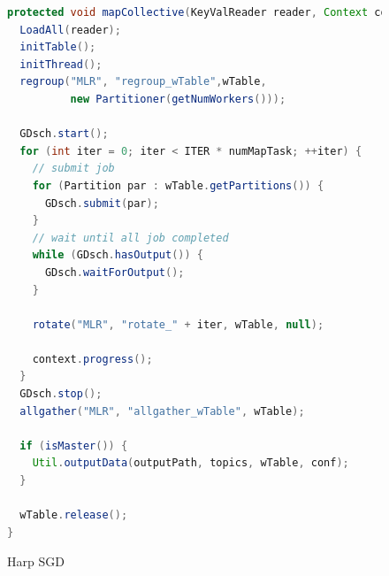 \documentclass{sig-alternate-05-2015}
\begin{document}
\begin{figure}
\begin{lstlisting}[language=java]
protected void mapCollective(KeyValReader reader, Context context) throws IOException, InterruptedException {
  LoadAll(reader);
  initTable();
  initThread();
  regroup("MLR", "regroup_wTable",wTable,
          new Partitioner(getNumWorkers()));

  GDsch.start();        
  for (int iter = 0; iter < ITER * numMapTask; ++iter) {
    // submit job
    for (Partition par : wTable.getPartitions()) {
      GDsch.submit(par);
    }
    // wait until all job completed
    while (GDsch.hasOutput()) {
      GDsch.waitForOutput();
    }
            
    rotate("MLR", "rotate_" + iter, wTable, null);

    context.progress();
  }
  GDsch.stop();
  allgather("MLR", "allgather_wTable", wTable);

  if (isMaster()) {
    Util.outputData(outputPath, topics, wTable, conf);
  }

  wTable.release();
}
\end{lstlisting}
\caption{Harp SGD}
\label{fig:SGD}
\end{figure}
\end{document}
